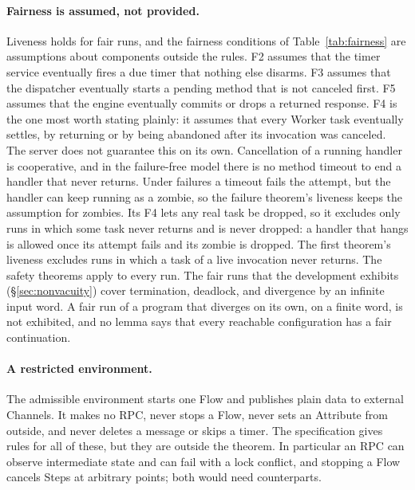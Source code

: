 \paragraph{Fairness is assumed, not provided.}
Liveness holds for fair runs, and the fairness conditions of
Table~\ref{tab:fairness} are assumptions about components outside the
rules. F2 assumes that the timer service eventually fires a due timer that
nothing else disarms. F3 assumes that the dispatcher eventually starts a
pending method that is not canceled first. F5 assumes
that the engine eventually commits or drops a returned response. F4 is the
one most worth stating plainly: it assumes that every Worker task
eventually settles, by returning or by being abandoned after its invocation
was canceled. The server does not guarantee this on its own. Cancellation
of a running handler is cooperative, and in the failure-free model there is
no method timeout to end a handler that never returns. Under failures a
timeout fails the attempt, but the handler can keep running as a zombie,
so the failure theorem's liveness keeps the assumption for zombies. Its F4
lets any real task be dropped, so it excludes only runs in which some task
never returns and is never dropped: a handler that hangs is allowed once
its attempt fails and its zombie is dropped. The first theorem's liveness excludes runs in which a task of a
live invocation never returns. The safety theorems apply to every run. The fair runs that the development exhibits
(\S\ref{sec:nonvacuity}) cover termination, deadlock, and divergence by an
infinite input word. A fair run of a program that diverges on its own, on a
finite word, is not exhibited, and no lemma says that every reachable
configuration has a fair continuation.

\paragraph{A restricted environment.}
The admissible environment starts one Flow and publishes plain data to
external Channels. It makes no RPC, never stops a Flow, never sets an
Attribute from outside, and never deletes a message or skips a timer. The
specification gives rules for all of these, but they are outside the
theorem. In particular an RPC can observe intermediate state and can fail
with a lock conflict, and stopping a Flow cancels Steps at arbitrary
points; both would need \Lang{} counterparts.

